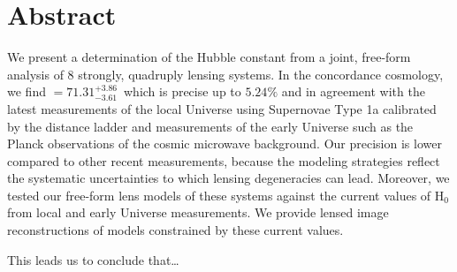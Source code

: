 
\clearpage

\section*{Abstract}
  \noindent We present a determination of the Hubble constant from a joint,
  free-form analysis of 8 strongly, quadruply lensing systems.  In the
  concordance cosmology, we find {\Ho{}$ = 71.31^{+3.86}_{-3.61}$\,\Hunits{}}
  which is precise up to $5.24\%$ and in agreement with the latest measurements
  of the local Universe using Supernovae Type 1a calibrated by the distance
  ladder and measurements of the early Universe such as the Planck observations
  of the cosmic microwave background.  Our precision is lower compared to other
  recent measurements, because the modeling strategies reflect the systematic
  uncertainties to which lensing degeneracies can lead.  Moreover, we tested our
  free-form lens models of these systems against the current values of H$_{0}$
  from local and early Universe measurements.  We provide lensed image
  reconstructions of models constrained by these current values.
  
  This leads us to conclude that\dots


  \clearpage
  
  
  
  
  
  
